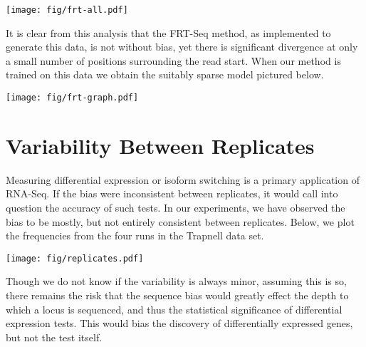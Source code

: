 \documentclass[letterpaper]{article}
\begin{document}
\begin{center}
\texttt{[image: fig/frt-all.pdf]}
\end{center}

It is clear from this analysis that the FRT-Seq method, as implemented to
generate this data, is not without bias, yet there is significant divergence at
only a small number of positions surrounding the read start. When our method is
trained on this data we obtain the suitably sparse model pictured below.

\begin{center}
\texttt{[image: fig/frt-graph.pdf]}
\end{center}



\section{Variability Between Replicates}

Measuring differential expression or isoform switching is a primary application of
RNA-Seq. If the bias were inconsistent between replicates, it would call into
question the accuracy of such tests. In our experiments, we have observed the
bias to be mostly, but not entirely consistent between replicates. Below, we
plot the frequencies from the four runs in the Trapnell data set.

\begin{center}
\texttt{[image: fig/replicates.pdf]}
\end{center}

Though we do not know if the variability is always minor, assuming this is so,
there remains the risk that the sequence bias would greatly effect the depth to
which a locus is sequenced, and thus the statistical significance of
differential expression tests. This would bias the discovery of differentially
expressed genes, but not the test itself.




\end{document}
